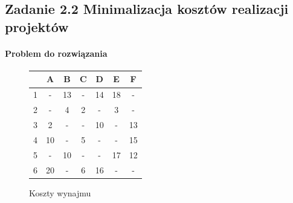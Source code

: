 \subsection{Zadanie 2.2 Minimalizacja kosztów realizacji projektów}
\paragraph{Problem do rozwiązania}
\begin{figure}[htb]
\caption{Koszty wynajmu}
\begin{center}
\begin{tabular}{ | c | c | c | c | c | c | c | }
\hline
  & A & B & C & D & E & F \\ 
 \hline
 1 & - & 13 & - & 14 & 18 & - \\  
 \hline
 2 & - & 4 & 2 & - & 3 & - \\
 \hline  
 3 & 2 & - & - & 10 & - & 13 \\
 \hline  
 4 & 10 & - & 5 & - & - & 15 \\
 \hline  
 5 & - & 10 & - & - & 17 & 12 \\
 \hline  
 6 & 20 & - & 6 & 16 & - & - \\
 \hline
\end{tabular}
\end{center}
\end{figure}

